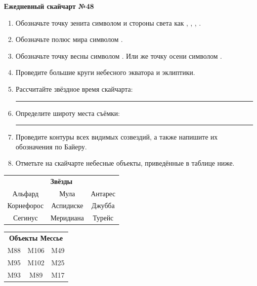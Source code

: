 \documentclass{./SAS-class-skygen}
\begin{document}
    
    
    
	\begin{center}
		\large\textbf{Ежедневный скайчарт №48}
	\end{center}

	\begin{enumerate}
		\item Обозначьте точку зенита символом  и стороны света как , , , .
		\item Обозначьте полюс мира символом .
		\item Обозначьте точку весны символом \Aries. Или же точку осени символом \Libra.
		\item Проведите большие круги небесного экватора и эклиптики.
		\item Рассчитайте звёздное время скайчарта: \rule{2cm}{0.4pt}
		\item Определите широту места съёмки: \rule{2cm}{0.4pt}
		\item Проведите контуры всех видимых созвездий, а также напишите их обозначения по Байеру.
		\item Отметьте на скайчарте небесные объекты, приведённые в таблице ниже.
	\end{enumerate}
	
    \vspace{0.5cm}

    \begin{table}[h!]
    \centering
    \begin{tabular}{ccc}
    \multicolumn{3}{c}{\textbf{Звёзды}} \\ Альфард & Мула & Антарес \\
Корнефорос & Аспидиске & Джубба \\
Сегинус & Меридиана & Турейс \\

\end{tabular}
    \hfill
    \begin{tabular}{ccc}
    \multicolumn{3}{c}{\textbf{Объекты Мессье}} \\ M88 & M106 & M49 \\
M95 & M102 & M25 \\
M93 & M89 & M17 \\

\end{tabular}
    \end{table}
	
\end{document}
